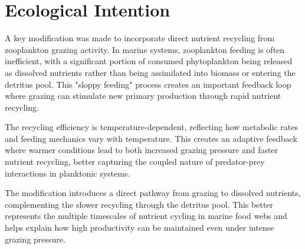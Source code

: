 \section{Ecological Intention}

A key modification was made to incorporate direct nutrient recycling from zooplankton grazing activity. In marine systems, zooplankton feeding is often inefficient, with a significant portion of consumed phytoplankton being released as dissolved nutrients rather than being assimilated into biomass or entering the detritus pool. This "sloppy feeding" process creates an important feedback loop where grazing can stimulate new primary production through rapid nutrient recycling.

The recycling efficiency is temperature-dependent, reflecting how metabolic rates and feeding mechanics vary with temperature. This creates an adaptive feedback where warmer conditions lead to both increased grazing pressure and faster nutrient recycling, better capturing the coupled nature of predator-prey interactions in planktonic systems.

The modification introduces a direct pathway from grazing to dissolved nutrients, complementing the slower recycling through the detritus pool. This better represents the multiple timescales of nutrient cycling in marine food webs and helps explain how high productivity can be maintained even under intense grazing pressure.
